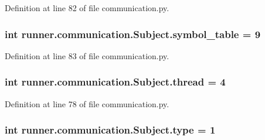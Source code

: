 Definition at line 82 of file communication.\+py.

\hypertarget{classrunner_1_1communication_1_1Subject_a69b02a4356abcf2c408db2b8d1e5879d}{}
\subsubsection[{symbol\+\_\+table}]{\setlength{\rightskip}{0pt plus 5cm}int runner.\+communication.\+Subject.\+symbol\+\_\+table = 9\hspace{0.3cm}{\ttfamily [static]}}\label{classrunner_1_1communication_1_1Subject_a69b02a4356abcf2c408db2b8d1e5879d}


Definition at line 83 of file communication.\+py.

\hypertarget{classrunner_1_1communication_1_1Subject_a9135fe15d8c09a20e8d50c992a42a642}{}
\subsubsection[{thread}]{\setlength{\rightskip}{0pt plus 5cm}int runner.\+communication.\+Subject.\+thread = 4\hspace{0.3cm}{\ttfamily [static]}}\label{classrunner_1_1communication_1_1Subject_a9135fe15d8c09a20e8d50c992a42a642}


Definition at line 78 of file communication.\+py.

\hypertarget{classrunner_1_1communication_1_1Subject_afe2029a9dc4876eaa8ccb8d59c65ee03}{}
\subsubsection[{type}]{\setlength{\rightskip}{0pt plus 5cm}int runner.\+communication.\+Subject.\+type = 1\hspace{0.3cm}{\ttfamily [static]}}\label{classrunner_1_1communication_1_1Subject_afe2029a9dc4876eaa8ccb8d59c65ee03}


